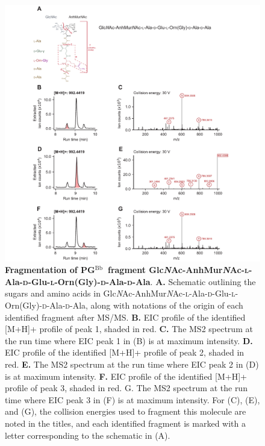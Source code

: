 \documentclass[twoside, watermark]{zHenriquesLab-StyleBioRxiv}
\newcommand{\pgbb}{PG$^\text{Bb}$}
\newcommand{\ZAEOAAG}{Glc\textit{N}Ac-AnhMur\textit{N}Ac-\textsc{l}-Ala-\textsc{d}-Glu-\textsc{l}-Orn(Gly)-\textsc{d}-Ala-\textsc{d}-Ala}
\begin{document}
\pagebreak
\begin{figure}[ht!]
    \centering
    \includegraphics[width = \textwidth]{Figures/Figure_S3_ZAEOAAG_MSMS.pdf}
    \caption{\textbf{Fragmentation of \pgbb~fragment \ZAEOAAG}. \textbf{A.} Schematic outlining the sugars and amino acids in \ZAEOAAG, along with notations of the origin of each identified fragment after MS/MS. \textbf{B.} EIC profile of the identified [M+H]+ profile of peak 1, shaded in red. \textbf{C.} The MS2 spectrum at the run time where EIC peak 1 in (B) is at maximum intensity. \textbf{D.} EIC profile of the identified [M+H]+ profile of peak 2, shaded in red. \textbf{E.} The MS2 spectrum at the run time where EIC peak 2 in (D) is at maximum intensity. \textbf{F.} EIC profile of the identified [M+H]+ profile of peak 3, shaded in red. G. The MS2 spectrum at the run time where EIC peak 3 in (F) is at maximum intensity. For (C), (E), and (G), the collision energies used to fragment this molecule are noted in the titles, and each identified fragment is marked with a letter corresponding to the schematic in (A).}
    \label{fig: figS3}
\end{figure}
\end{document}
